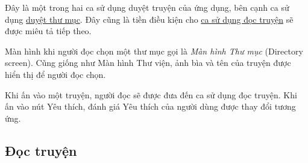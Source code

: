 \documentclass[../../thesis]{subfiles}
\begin{document}
Đây là một trong hai ca sử dụng duyệt truyện của ứng dụng, bên cạnh ca sử dụng
\hyperref[sec:show-folders-inside-library]{duyệt thư mục}. Đây cũng là tiền điều
kiện cho \hyperref[sec:read-comic]{ca sử dụng đọc truyện} sẽ được miêu tả tiếp
theo.

Màn hình khi người đọc chọn một thư mục gọi là \emph{Màn hình Thư mục}
(Directory screen). Cũng giống như Màn hình Thư viện, ảnh bìa và tên của truyện
được hiển thị để người đọc chọn.

Khi ấn vào một truyện, người đọc sẽ được đưa đến ca sử dụng đọc truyện. Khi ấn
vào nút Yêu thích, đánh giá Yêu thích của người dùng được thay đổi tương ứng.

\subsection{Đọc truyện}\label{sec:read-comic}
\end{document}
